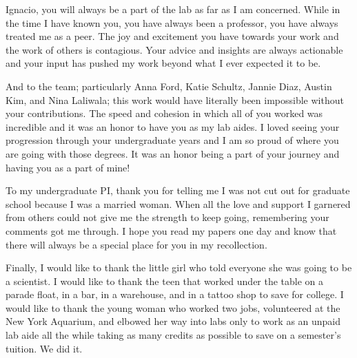 \documentclass[12pt,reqno,oneside]{report}
\begin{document}
Ignacio, you will always be a part of the lab as far as I am concerned. While in the time I have known you, you have always been a professor, you have always treated me as a peer. The joy and excitement you have towards your work and the work of others is contagious. Your advice and insights are always actionable and your input has pushed my work beyond what I ever expected it to be.

And to the team; particularly Anna Ford, Katie Schultz, Jannie Diaz, Austin Kim, and Nina Laliwala; this work would have literally been impossible without your contributions. The speed and cohesion in which all of you worked was incredible and it was an honor to have you as my lab aides. I loved seeing your progression through your undergraduate years and I am so proud of where you are going with those degrees. It was an honor being a part of your journey and having you as a part of mine!

To my undergraduate PI, thank you for telling me I was not cut out for graduate school because I was a married woman. When all the love and support I garnered from others could not give me the strength to keep going, remembering your comments got me through. I hope you read my papers one day and know that there will always be a special place for you in my recollection.

Finally, I would like to thank the little girl who told everyone she was going to be a scientist. I would like to thank the teen that worked under the table on a parade float, in a bar, in a warehouse, and in a tattoo shop to save for college. I would like to thank the young woman who worked two jobs, volunteered at the New York Aquarium, and elbowed her way into labs only to work as an unpaid lab aide all the while taking as many credits as possible to save on a semester's tuition. We did it.

\vspace*{\fill}

\newpage
\thispagestyle{plain}
\setcounter{tocdepth}{2}
\tableofcontents
\listoffigures
{}
\listoftables
{}

\newpage
\thispagestyle{plain}
\end{document}
